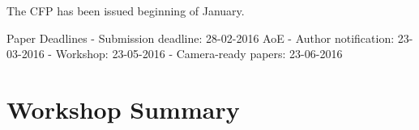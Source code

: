 \documentclass{llncs}
\begin{document}
The CFP has been issued beginning of January.

Paper Deadlines
- Submission deadline: 28-02-2016 AoE
- Author notification: 23-03-2016
- Workshop: 23-05-2016
- Camera-ready papers: 23-06-2016  




\section{Workshop Summary}
\label{sec:summary}




\end{document}
